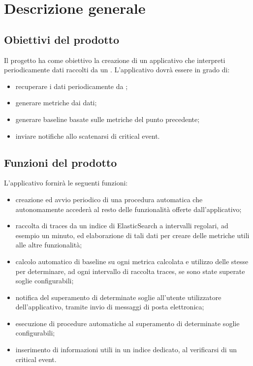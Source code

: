 \section{Descrizione generale} \label{descrizione generale}

    \subsection{Obiettivi del prodotto}

        Il progetto ha come obiettivo la creazione di un applicativo che interpreti periodicamente dati raccolti da un
        . L'applicativo dovrà essere in grado di:
        \begin{itemize}
            \item recuperare i dati periodicamente da ;
        	\item generare metriche dai dati;
        	\item generare baseline basate sulle metriche del punto precedente;
        	\item inviare notifiche allo scatenarsi di critical event.
		\end{itemize}

    \subsection{Funzioni del prodotto}

        L'applicativo fornirà le seguenti funzioni:

        \begin{itemize}

            \item creazione ed avvio periodico di una procedura automatica che autonomamente accederà al resto delle
            funzionalità offerte dall'applicativo;
            \item raccolta di traces da un indice di ElasticSearch a intervalli regolari, ad esempio un minuto, ed
            elaborazione di tali dati per creare delle metriche utili alle altre funzionalità;
            \item calcolo automatico di baseline su ogni metrica calcolata e utilizzo delle stesse per determinare, ad ogni
            intervallo di raccolta traces, se sono state superate soglie configurabili;
            \item notifica del superamento di determinate soglie all'utente utilizzatore dell'applicativo, tramite
            invio di messaggi di posta elettronica;
            \item esecuzione di procedure automatiche al superamento di determinate soglie configurabili;
            \item inserimento di informazioni utili in un indice dedicato, al verificarsi di un critical event.

        \end{itemize}
        

